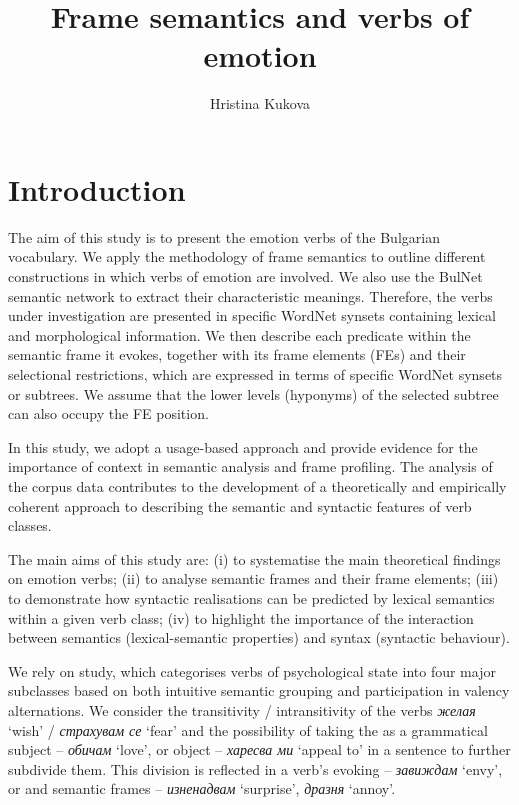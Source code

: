 \documentclass[output=paper,colorlinks,citecolor=brown]{langscibook}
\author{Hristina Kukova\orcid{0000-0001-9938-5462}\affiliation{Department of Computational Linguistics, Institute for Bulgarian Language, Bulgarian Academy of Sciences}}
\title{Frame semantics and verbs of emotion}
\begin{document}
\maketitle

\section{Introduction} 
The aim of this study is to present the emotion verbs of the Bulgarian vocabulary. We apply the methodology of frame semantics to outline different constructions in which verbs of emotion are involved. We also use the BulNet semantic network to extract their characteristic meanings. Therefore, the verbs under investigation are presented in specific WordNet synsets containing lexical and morphological information. We then describe each predicate within the semantic frame it evokes, together with its frame elements (FEs) and their selectional restrictions, which are expressed in terms of specific WordNet synsets or subtrees. We assume that the lower levels (hyponyms) of the selected subtree can also occupy the FE position.

In this study, we adopt a usage-based approach and provide evidence for the importance of context in semantic analysis and frame profiling. The analysis of the corpus data contributes to the development of a theoretically and empirically coherent approach to describing the semantic and syntactic features of verb classes.

The main aims of this study are: (i) to systematise the main theoretical findings on emotion verbs; (ii) to analyse semantic frames and their frame elements; (iii) to demonstrate how syntactic realisations can be predicted by lexical semantics within a given verb class; (iv) to highlight the importance of the interaction between semantics (lexical-semantic properties) and syntax (syntactic behaviour).
 

We rely on  study, which categorises verbs of psychological state into four major subclasses based on both intuitive semantic grouping and participation in valency alternations. We consider the transitivity / intransitivity of the verbs \textit{желая} `wish' / \textit{страхувам се} `fear' and the possibility of taking the  as a grammatical subject -- \textit{обичам} `love', or object -- \textit{харесва ми} `appeal to' in a sentence to further subdivide them. This division is reflected in a verb’s evoking
   -- \textit{завиждам} `envy', or  and   semantic frames -- \textit{изненадвам} `surprise', \textit{дразня} `annoy'. 
 
\end{document}
